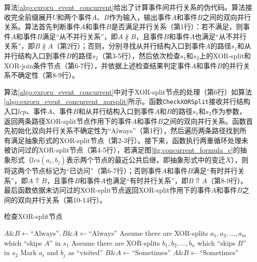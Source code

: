 算法\ref{algo:exroru_event_concurrent}给出了计算事件间并行关系的伪代码。算法接收完全前缀展开$U$和两个事件$A$、$B$作为输入，输出事件$A$和事件$B$之间的双向并行关系。算法首先判断事件$A$和事件$B$是否满足并行关系（第1行）：若不满足，则事件$A$和事件$B$满足“从不并行关系”，即$A\nparallel B$，且事件$B$和事件$A$也满足“从不并行关系”，即$B\nparallel A$（第2行）；否则，分别寻找从并行结构入口到事件$A$的路径$s_{1}$和从并行结构入口到事件$B$的路径$s_{2}$（第3-5行），然后依次检查$s_{1}$和$s_{2}$上的XOR-split和XOR-join条件节点（第6-7行），并依据上述检查结果判定事件$A$和事件$B$的并行关系不确定性（第8-9行）。

算法\ref{algo:exroru_event_concurrent}中对于XOR-split节点的处理（第6行）如算法\ref{algo:exroru_event_concurrent_xorsplit}所示。函数\texttt{CheckXORSplit}接收并行结构入口$lcp$、事件$A$、事件$B$和从并行结构入口到事件$A$和$B$的路径$s_{1}$和$s_{2}$作为参数，返回两条路径XOR-split节点作用下的事件$A$和事件$B$之间的双向并行关系。函数首先初始化双向并行关系不确定性为“Always”（第1行），然后遍历两条路径找到所有满足抽象形式的XOR-split节点（第2-3行）。接下来，函数执行两重循环处理未被访问过的XOR-split节点（第4-5行），若满足图\ref{fig:concurrent_formula_c}的抽象形式（$lcs(a_{i},b_{j})$表示两个节点的最近公共后继，即抽象形式中的变迁$X$），则将这两个节点标记为“已访问”（第6-7行）；否则事件$A$和事件$B$满足“有时并行关系”，即$A\Uparrow B$，且事件$B$和事件$A$也满足“有时并行关系”，即$B\Uparrow A$（第8-9行）。最后函数依据未访问过的XOR-split节点返回XOR-split作用下的事件$A$和事件$B$之间的双向并行关系（第10-14行）。

\begin{algorithm}[htbp]
  \LinesNumbered
  \caption{检查XOR-split节点}
  \label{algo:exroru_event_concurrent_xorsplit}
   {
  	\nl $A\&B\leftarrow\text{``Always''},B\&A\leftarrow\text{``Always''}$\;
  	\nl Assume there are XOR-splits $a_{1},a_{2},...,a_{m}$ which ``skips $A$'' in $s_{1}$\;
  	\nl Assume there are XOR-splits $b_{1},b_{2},...,b_{n}$ which ``skips $B$'' in $s_{2}$\;
  	\nl {} {
  	  \nl {} {
  	    \nl {} {
  	      \nl Mark $a_{i}$ and $b_{j}$ as ``visited''\;
  	    } \nl {}
  	  }
  	}
  	\nl {} {
  	  \nl $B\&A\leftarrow\text{``Sometimes''}$\;
  	}
  	\nl {} {
  	  \nl $A\&B\leftarrow\text{``Sometimes''}$\;
  	}
  	\nl {}
  }
\end{algorithm}

